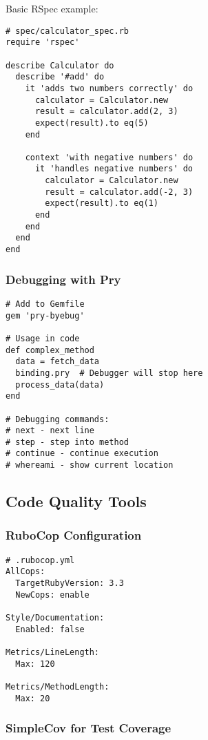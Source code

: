 \documentclass[12pt,a4paper]{article}
\begin{document}
Basic RSpec example:
\begin{lstlisting}
# spec/calculator_spec.rb
require 'rspec'

describe Calculator do
  describe '#add' do
    it 'adds two numbers correctly' do
      calculator = Calculator.new
      result = calculator.add(2, 3)
      expect(result).to eq(5)
    end
    
    context 'with negative numbers' do
      it 'handles negative numbers' do
        calculator = Calculator.new
        result = calculator.add(-2, 3)
        expect(result).to eq(1)
      end
    end
  end
end
\end{lstlisting}

\subsubsection{Debugging with Pry}

\begin{lstlisting}
# Add to Gemfile
gem 'pry-byebug'

# Usage in code
def complex_method
  data = fetch_data
  binding.pry  # Debugger will stop here
  process_data(data)
end

# Debugging commands:
# next - next line
# step - step into method
# continue - continue execution
# whereami - show current location
\end{lstlisting}

\subsection{Code Quality Tools}

\subsubsection{RuboCop Configuration}

\begin{lstlisting}
# .rubocop.yml
AllCops:
  TargetRubyVersion: 3.3
  NewCops: enable

Style/Documentation:
  Enabled: false

Metrics/LineLength:
  Max: 120

Metrics/MethodLength:
  Max: 20
\end{lstlisting}

\subsubsection{SimpleCov for Test Coverage}
\end{document}
